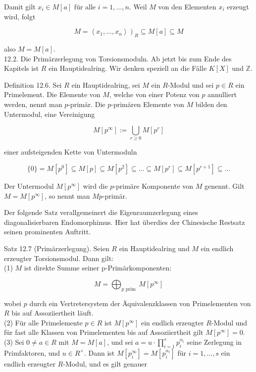 \documentclass[10pt, letterpaper]{article}
\begin{document}
Damit gilt $x_{i} \in M[a]$ für alle $i=1, \ldots, n$. Weil $M$ von den Elementen $x_{i}$ erzeugt wird, folgt

$$
\left.M=\left\langle x_{1}, \ldots, x_{n}\right\rangle\right)_{R} \subseteq M[a] \subseteq M
$$

also $M=M[a]$.\\
12.2. Die Primärzerlegung von Torsionsmoduln. Ab jetzt bis zum Ende des Kapitels ist $R$ ein Hauptidealring. Wir denken speziell an die Fälle $K[X]$ und $\mathbb{Z}$.

Definition 12.6. Sei $R$ ein Hauptidealring, sei $M$ ein $R$-Modul und sei $p \in R$ ein Primelement. Die Elemente von $M$, welche von einer Potenz von $p$ annulliert werden, nennt man $p$-primär. Die $p$-primären Elemente von $M$ bilden den Untermodul, eine Vereinigung

$$
M\left[p^{\infty}\right]:=\bigcup_{r \geq 0} M\left[p^{r}\right]
$$

einer aufsteigenden Kette von Untermoduln

$$
\{0\}=M\left[p^{0}\right] \subseteq M[p] \subseteq M\left[p^{2}\right] \subseteq \ldots \subseteq M\left[p^{r}\right] \subseteq M\left[p^{r+1}\right] \subseteq \ldots
$$

Der Untermodul $M\left[p^{\infty}\right]$ wird die $p$-primäre Komponente von $M$ genennt. Gilt $M=M\left[p^{\infty}\right]$, so nennt man $M p$-primär.

Der folgende Satz verallgemeinert die Eigenraumzerlegung eines diagonalisierbaren Endomorphimus. Hier hat überdies der Chinesische Restsatz seinen prominenten Auftritt.

Satz 12.7 (Primärzerlegung). Seien $R$ ein Hauptidealring und $M$ ein endlich erzeugter Torsionsmodul. Dann gilt:\\
(1) $M$ ist direkte Summe seiner p-Primärkomponenten:

$$
M=\bigoplus_{p \text { prim }} M\left[p^{\infty}\right]
$$

wobei $p$ durch ein Vertretersystem der Äquivalenzklassen von Primelementen von $R$ bis auf Assoziiertheit läuft.\\
(2) Für alle Primelemente $p \in R$ ist $M\left[p^{\infty}\right]$ ein endlich erzeugter $R$-Modul und für fast alle Klassen von Primelementen bis auf Assoziiertheit gilt $M\left[p^{\infty}\right]=0$.\\
(3) Sei $0 \neq a \in R$ mit $M=M[a]$, und sei $a=u \cdot \prod_{i=1}^{s} p_{i}^{\alpha_{i}}$ seine Zerlegung in Primfaktoren, und $u \in R^{\times}$. Dann ist $M\left[p_{i}^{\infty}\right]=M\left[p_{i}^{\alpha_{i}}\right]$ für $i=1, \ldots, s$ ein endlich erzeugter $R$-Modul, und es gilt genauer
\end{document}
